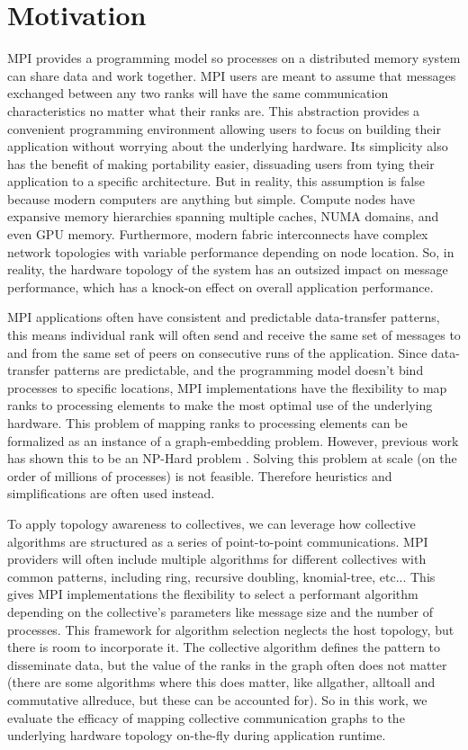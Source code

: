 \section{Motivation}
MPI provides a programming model so processes on a distributed memory system can share data and work together.
MPI users are meant to assume that messages exchanged between any two ranks will have the same communication characteristics no matter what their ranks are. 
This abstraction provides a convenient programming environment allowing users to focus on building their application without worrying about the underlying hardware. 
Its simplicity also has the benefit of making portability easier, dissuading users from tying their application to a specific architecture.
But in reality, this assumption is false because modern computers are anything but simple. 
Compute nodes have expansive memory hierarchies spanning multiple caches, NUMA domains, and even GPU memory.
Furthermore, modern fabric interconnects have complex network topologies with variable performance depending on node location.
So, in reality, the hardware topology of the system has an outsized impact on message performance, which has a knock-on effect on overall application performance. 

MPI applications often have consistent and predictable data-transfer patterns, this means individual rank will often send and receive the same set of messages to and from the same set of peers on consecutive runs of the application.
Since data-transfer patterns are predictable, and the programming model doesn't bind processes to specific locations, MPI implementations have the flexibility to map ranks to processing elements to make the most optimal use of the underlying hardware.
This problem of mapping ranks to processing elements can be formalized as an instance of a graph-embedding problem.
However, previous work has shown this to be an NP-Hard problem \cite{Hoefler2011GenericTopoMappingStrats}. 
Solving this problem at scale (on the order of millions of processes) is not feasible. Therefore heuristics and simplifications are often used instead.

To apply topology awareness to collectives, we can leverage how collective algorithms are structured as a series of point-to-point communications.
MPI providers will often include multiple algorithms for different collectives with common patterns, including ring, recursive doubling, knomial-tree, etc...
This gives MPI implementations the flexibility to select a performant algorithm depending on the collective's parameters like message size and the number of processes.
This framework for algorithm selection neglects the host topology, but there is room to incorporate it.
The collective algorithm defines the pattern to disseminate data, but the value of the ranks in the graph often does not matter (there are some algorithms where this does matter, like allgather, alltoall and commutative allreduce, but these can be accounted for).
So in this work, we evaluate the efficacy of mapping collective communication graphs to the underlying hardware topology on-the-fly during application runtime.

